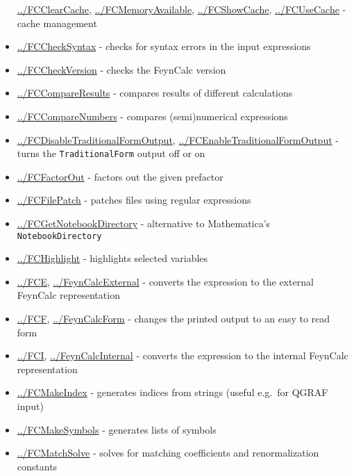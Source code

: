 \documentclass[../FeynCalcManual.tex]{subfiles}
\begin{document}
\begin{itemize}
  \hyperlink{../fcclearcache}{../FCClearCache},
  \hyperlink{../fcmemoryavailable}{../FCMemoryAvailable},
  \hyperlink{../fcshowcache}{../FCShowCache},
  \hyperlink{../fcusecache}{../FCUseCache} - cache management
\item
  \hyperlink{../fcchecksyntax}{../FCCheckSyntax} - checks for syntax
  errors in the input expressions
\item
  \hyperlink{../fccheckversion}{../FCCheckVersion} - checks the FeynCalc
  version
\item
  \hyperlink{../fccompareresults}{../FCCompareResults} - compares
  results of different calculations
\item
  \hyperlink{../fccomparenumbers}{../FCCompareNumbers} - compares
  (semi)numerical expressions
\item
  \hyperlink{../fcdisabletraditionalformoutput}{../FCDisableTraditionalFormOutput},
  \hyperlink{../fcenabletraditionalformoutput}{../FCEnableTraditionalFormOutput}
  - turns the \texttt{TraditionalForm} output off or on
\item
  \hyperlink{../fcfactorout}{../FCFactorOut} - factors out the given
  prefactor
\item
  \hyperlink{../fcfilepatch}{../FCFilePatch} - patches files using
  regular expressions
\item
  \hyperlink{../fcgetnotebookdirectory}{../FCGetNotebookDirectory} -
  alternative to Mathematica's \texttt{NotebookDirectory}
\item
  \hyperlink{../fchighlight}{../FCHighlight} - highlights selected
  variables
\item
  \hyperlink{../fce}{../FCE},
  \hyperlink{../feyncalcexternal}{../FeynCalcExternal} - converts the
  expression to the external FeynCalc representation
\item
  \hyperlink{../fcf}{../FCF},
  \hyperlink{../feyncalcform}{../FeynCalcForm} - changes the printed
  output to an easy to read form
\item
  \hyperlink{../fci}{../FCI},
  \hyperlink{../feyncalcinternal}{../FeynCalcInternal} - converts the
  expression to the internal FeynCalc representation
\item
  \hyperlink{../fcmakeindex}{../FCMakeIndex} - generates indices from
  strings (useful e.g.~for QGRAF input)
\item
  \hyperlink{../fcmakesymbols}{../FCMakeSymbols} - generates lists of
  symbols
\item
  \hyperlink{../fcmatchsolve}{../FCMatchSolve} - solves for matching
  coefficients and renormalization constants

\end{itemize}
\end{document}
